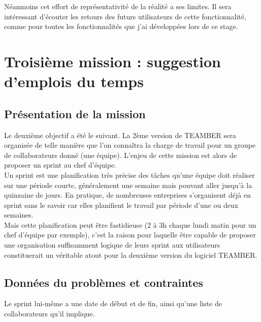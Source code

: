 \documentclass[12pt]{article}
\begin{document}
Néanmoins cet effort de représentativité de la réalité a ses limites. Il sera intéressant d'écouter les retours des futurs utilisateurs de cette fonctionnalité, comme pour toutes les fonctionnalités que j'ai développées lors de ce stage.





\newpage
\section{Troisième mission : suggestion d'emplois du temps}
\subsection{Présentation de la mission}


Le deuxième objectif a été le suivant. La 2ème version de TEAMBER sera organisée de telle manière que l'on connaîtra la charge de travail pour un groupe de collaborateurs donné (une équipe). L'enjeu de cette mission est alors de proposer un sprint au chef d'équipe.\\
Un sprint est une planification très précise des tâches qu'une équipe doit réaliser sur une période courte, généralement une semaine mais pouvant aller jusqu'à la quinzaine de jours. En pratique, de nombreuses entreprises s'organisent déjà en sprint sans le savoir car elles planifient le travail par période d'une ou deux semaines.\\
Mais cette planification peut être fastidieuse (2 à 3h chaque lundi matin pour un chef d'équipe par exemple), c'est la raison pour laquelle être capable de proposer une organisation suffisamment logique de leurs sprint aux utilisateurs constituerait un véritable atout pour la deuxième version du logiciel TEAMBER.

\subsection{Données du problèmes et contraintes}

Le sprint lui-même a une date de début et de fin, ainsi qu'une liste de collaborateurs qu'il implique.
\end{document}
